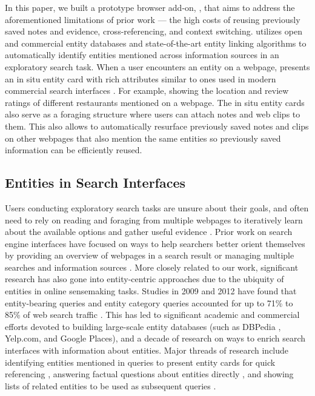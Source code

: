 In this paper, we built a prototype browser add-on, {\SYSTEM}, that aims to address the aforementioned limitations of prior work --- the high costs of reusing previously saved notes and evidence, cross-referencing, and context switching. {\SYSTEM} utilizes open and commercial entity databases \cite{dbpedia} and state-of-the-art entity linking algorithms \cite{spotlight} to automatically identify entities mentioned across information sources in an exploratory search task. When a user encounters an entity on a webpage, {\SYSTEM} presents an in situ entity card with rich attributes similar to ones used in modern commercial search interfaces \cite{miliaraki2015selena,bota}. For example, showing the location and review ratings of different restaurants mentioned on a webpage. The in situ entity cards also serve as a foraging structure where users can attach notes and web clips to them. This also allows {\SYSTEM} to automatically resurface previously saved notes and clips on other webpages that also mention the same entities so previously saved information can be efficiently reused.

\subsection{Entities in Search Interfaces}

Users conducting exploratory search tasks are unsure about their goals, and often need to rely on reading and foraging from multiple webpages to iteratively learn about the available options and gather useful evidence \cite{mar2006exp}. Prior work on search engine interfaces have focused on ways to help searchers better orient themselves by providing an overview of webpages in a search result \cite{marchionini2000agileviews,patterson2001predicting,tretter2013searchpanel} or managing multiple searches and information sources \cite{morris2008searchbar,hahn2018bento}. More closely related to our work, significant research has also gone into entity-centric approaches due to the ubiquity of entities in online sensemaking tasks. Studies in 2009 and 2012 have found that entity-bearing queries and entity category queries accounted for up to 71\% to 85\% of web search traffic \cite{guo2009named,lin2012active}. This has led to significant academic and commercial efforts devoted to building large-scale entity databases (such as DBPedia \cite{dbpedia}, Yelp.com, and Google Places), and a decade of research on ways to enrich search interfaces with information about entities. Major threads of research include identifying entities mentioned in queries to present entity cards for quick referencing \cite{bota,miliaraki2015selena}, answering factual questions about entities directly \cite{D15-1038}, and showing lists of related entities to be used as subsequent queries \cite{blanco2013entity, bordino2013penguins,klouche2015designing}. 

